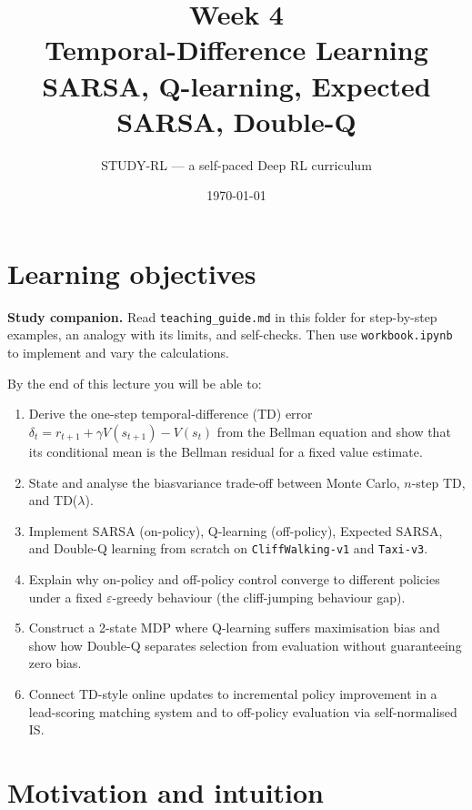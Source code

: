 \documentclass[11pt,oneside]{scrbook}
\title{{\color{rlblue}\textbf{Week 4}} \\[0.4em] \Huge Temporal-Difference Learning \\[0.2em] \LARGE SARSA, Q-learning, Expected SARSA, Double-Q}
\author{STUDY-RL --- a self-paced Deep RL curriculum}
\date{\today}
\begin{document}
\maketitle
\tableofcontents
\newpage

\chapter*{Learning objectives}


\noindent\textbf{Study companion.} Read \texttt{teaching\_guide.md} in this
folder for step-by-step examples, an analogy with its limits, and self-checks.
Then use \texttt{workbook.ipynb} to implement and vary the calculations.
\par\medskip

\begin{keyidea}
By the end of this lecture you will be able to:
\begin{enumerate}
  \item Derive the one-step temporal-difference (TD) error $\delta_t = r_{t+1} + \gamma V(s_{t+1}) - V(s_t)$ from the Bellman equation and show that its conditional mean is the Bellman residual for a fixed value estimate.
  \item State and analyse the bias\textendash variance trade-off between Monte Carlo, $n$-step TD, and TD($\lambda$).
  \item Implement SARSA (on-policy), Q-learning (off-policy), Expected SARSA, and Double-Q learning from scratch on \texttt{CliffWalking-v1} and \texttt{Taxi-v3}.
  \item Explain why on-policy and off-policy control converge to different policies under a fixed $\varepsilon$-greedy behaviour (the cliff-jumping behaviour gap).
  \item Construct a 2-state MDP where Q-learning suffers maximisation bias and show how Double-Q separates selection from evaluation without guaranteeing zero bias.
  \item Connect TD-style online updates to incremental policy improvement in a lead-scoring matching system and to off-policy evaluation via self-normalised IS.
\end{enumerate}
\end{keyidea}

\chapter{Motivation and intuition}
\end{document}
